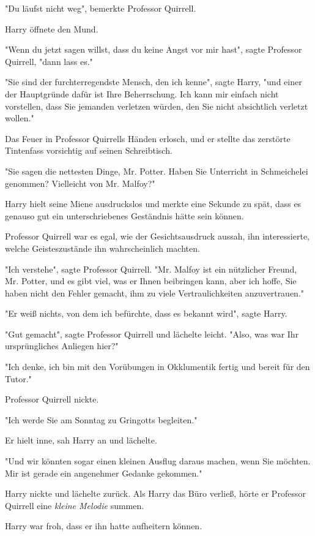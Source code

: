 {"Du läufst nicht weg", bemerkte Professor Quirrell.

Harry öffnete den Mund.

"Wenn du jetzt sagen willst, dass du keine Angst vor mir hast", sagte Professor Quirrell, "dann lass es."

"Sie sind der furchterregendste Mensch, den ich kenne", sagte Harry, "und einer der Hauptgründe dafür ist Ihre Beherrschung. Ich kann mir einfach nicht vorstellen, dass Sie jemanden verletzen würden, den Sie nicht absichtlich verletzt wollen."

Das Feuer in Professor Quirrells Händen erlosch, und er stellte das zerstörte Tintenfass vorsichtig auf seinen Schreibtisch.

"Sie sagen die nettesten Dinge, Mr. Potter. Haben Sie Unterricht in Schmeichelei genommen? Vielleicht von Mr. Malfoy?"

Harry hielt seine Miene ausdruckslos und merkte eine Sekunde zu spät, dass es genauso gut ein unterschriebenes Geständnis hätte sein können.

Professor Quirrell war es egal, wie der Gesichtsausdruck aussah, ihn interessierte, welche Geisteszustände ihn wahrscheinlich machten.

"Ich verstehe", sagte Professor Quirrell. "Mr. Malfoy ist ein nützlicher Freund, Mr. Potter, und es gibt viel, was er Ihnen beibringen kann, aber ich hoffe, Sie haben nicht den Fehler gemacht, ihm zu viele Vertraulichkeiten anzuvertrauen."

"Er weiß nichts, von dem ich befürchte, dass es bekannt wird", sagte Harry.

"Gut gemacht", sagte Professor Quirrell und lächelte leicht. "Also, was war Ihr ursprüngliches Anliegen hier?"

"Ich denke, ich bin mit den Vorübungen in Okklumentik fertig und bereit für den Tutor."

Professor Quirrell nickte.

"Ich werde Sie am Sonntag zu Gringotts begleiten."

Er hielt inne, sah Harry an und lächelte.

"Und wir könnten sogar einen kleinen Ausflug daraus machen, wenn Sie möchten. Mir ist gerade ein angenehmer Gedanke gekommen."

Harry nickte und lächelte zurück. Als Harry das Büro verließ, hörte er Professor Quirrell eine \emph{kleine Melodie} summen.

Harry war froh, dass er ihn hatte aufheitern können.

}
